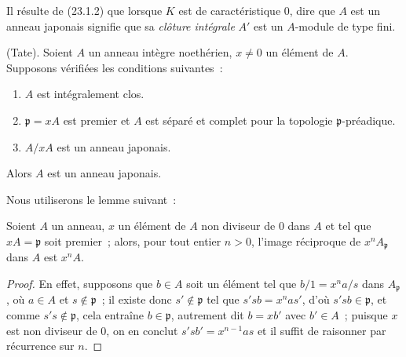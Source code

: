 Il résulte de (23.1.2) que lorsque $K$ est de caractéristique $0$, dire que
$A$ est un anneau japonais signifie que sa \emph{clôture intégrale} $A'$ est
un $A$-module de type fini.

\begin{theorem}[23.1.3]
\label{0.23.1.3-fr}
\textnormal{(Tate).} Soient $A$ un anneau intègre noethérien, $x\neq0$ un
élément de $A$. Supposons vérifiées les conditions suivantes~:
\begin{enumerate}
  \item[(i)] $A$ est intégralement clos.
  \item[(ii)] $\mathfrak p=xA$ est premier et $A$ est séparé et complet pour
  la topologie $\mathfrak p$-préadique.
  \item[(iii)] $A/xA$ est un anneau japonais.
\end{enumerate}
Alors $A$ est un anneau japonais.
\end{theorem}

Nous utiliserons le lemme suivant~:

\begin{lemma}[23.1.3.1]
\label{0.23.1.3.1-fr}
Soient $A$ un anneau, $x$ un élément de $A$ non diviseur de $0$ dans $A$ et
tel que $xA=\mathfrak p$ soit premier~; alors, pour tout entier $n>0$,
l'image réciproque de $x^nA_{\mathfrak p}$ dans $A$ est $x^nA$.
\end{lemma}

\begin{proof}
En effet, supposons que $b\in A$ soit un élément tel que
$b/1=x^na/s$ dans $A_{\mathfrak p}$, où $a\in A$ et
$s\notin\mathfrak p$~; il existe donc $s'\notin\mathfrak p$ tel que
$s'sb=x^nas'$, d'où $s'sb\in\mathfrak p$, et comme
$s's\notin\mathfrak p$, cela entraîne $b\in\mathfrak p$, autrement dit
$b=xb'$ avec $b'\in A$~; puisque $x$ est non diviseur de $0$, on en conclut
$s'sb'=x^{n-1}as$ et il suffit de raisonner par récurrence sur $n$.
\end{proof}

